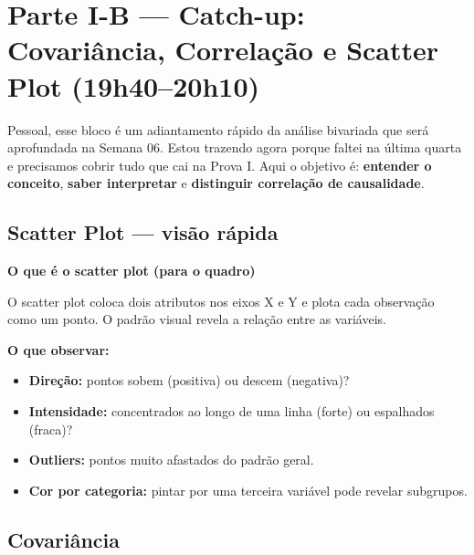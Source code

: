 \section{Parte I-B — Catch-up: Covariância, Correlação e Scatter Plot (19h40–20h10)}

Pessoal, esse bloco é um adiantamento rápido da análise bivariada que será
aprofundada na Semana 06. Estou trazendo agora porque faltei na última quarta
e precisamos cobrir tudo que cai na Prova I. Aqui o objetivo é:
\textbf{entender o conceito}, \textbf{saber interpretar} e \textbf{distinguir
correlação de causalidade}.

\subsection{Scatter Plot — visão rápida}

\begin{BoardBox}
\textbf{O que é o scatter plot (para o quadro)}

O scatter plot coloca dois atributos nos eixos X e Y e plota cada observação
como um ponto. O padrão visual revela a relação entre as variáveis.

\textbf{O que observar:}
\begin{itemize}
  \item \textbf{Direção:} pontos sobem (positiva) ou descem (negativa)?
  \item \textbf{Intensidade:} concentrados ao longo de uma linha (forte) ou espalhados (fraca)?
  \item \textbf{Outliers:} pontos muito afastados do padrão geral.
  \item \textbf{Cor por categoria:} pintar por uma terceira variável pode revelar subgrupos.
\end{itemize}
\end{BoardBox}

\subsection{Covariância}

